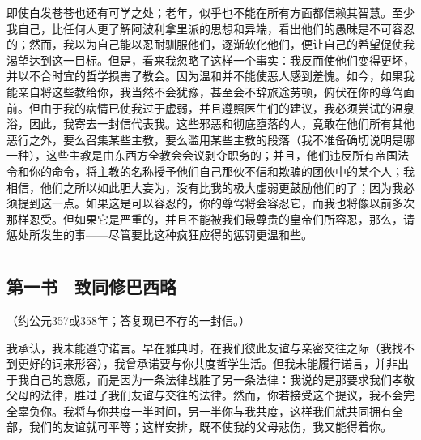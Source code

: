 即使白发苍苍也还有可学之处；老年，似乎也不能在所有方面都信赖其智慧。至少我自己，比任何人更了解阿波利拿里派的思想和异端，看出他们的愚昧是不可容忍的；然而，我以为自己能以忍耐驯服他们，逐渐软化他们，便让自己的希望促使我渴望达到这一目标。但是，看来我忽略了这样一个事实：我反而使他们变得更坏，并以不合时宜的哲学损害了教会。因为温和并不能使恶人感到羞愧。如今，如果我能亲自将这些教给你，我当然不会犹豫，甚至会不辞旅途劳顿，俯伏在你的尊驾面前。但由于我的病情已使我过于虚弱，并且遵照医生们的建议，我必须尝试的温泉浴，因此，我寄去一封信代表我。这些邪恶和彻底堕落的人，竟敢在他们所有其他恶行之外，要么召集某些主教，要么滥用某些主教的段落（我不准备确切说明是哪一种），这些主教是由东西方全教会会议剥夺职务的；并且，他们违反所有帝国法令和你的命令，将主教的名称授予他们自己那伙不信和欺骗的团伙中的某个人；我相信，他们之所以如此胆大妄为，没有比我的极大虚弱更鼓励他们的了；因为我必须提到这一点。如果这是可以容忍的，你的尊驾将会容忍它，而我也将像以前多次那样忍受。但如果它是严重的，并且不能被我们最尊贵的皇帝们所容忍，那么，请惩处所发生的事——尽管要比这种疯狂应得的惩罚更温和些。\par



\section{}

\par


\subsection{第一书　致同修巴西略}

（约公元357或358年；答复现已不存的一封信。）\par

我承认，我未能遵守诺言。早在雅典时，在我们彼此友谊与亲密交往之际（我找不到更好的词来形容），我曾承诺要与你共度哲学生活。但我未能履行诺言，并非出于我自己的意愿，而是因为一条法律战胜了另一条法律：我说的是那要求我们孝敬父母的法律，胜过了我们友谊与交往的法律。然而，你若接受这个提议，我不会完全辜负你。我将与你共度一半时间，另一半你与我共度，这样我们就共同拥有全部，我们的友谊就可平等；这样安排，既不使我的父母悲伤，我又能得着你。\par

